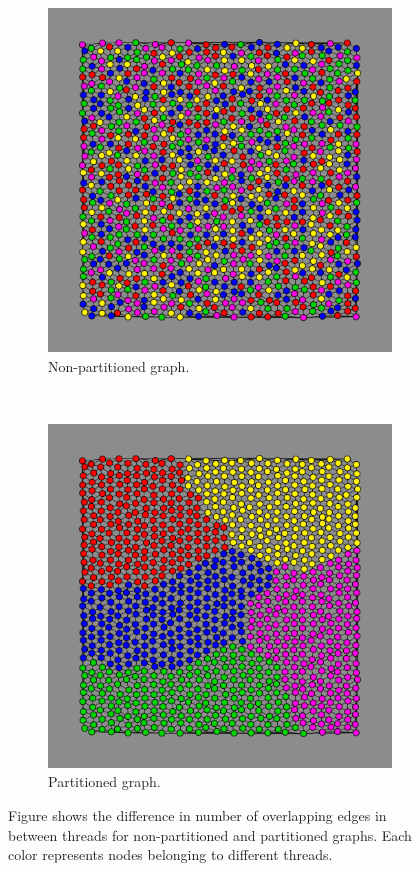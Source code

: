 \begin{figure}[H]
\centering
\begin{subfigure}[b]{0.48\textwidth}
\includegraphics[width=\textwidth]{img/partitioning_false.png}
\caption{Non-partitioned graph.}
\end{subfigure}
~
\begin{subfigure}[b]{0.48\textwidth}
\includegraphics[width=\textwidth]{img/partitioning_true.png}
\caption{Partitioned graph.}
\end{subfigure}
\caption{Figure shows the difference in number of overlapping edges in between threads for non-partitioned and partitioned graphs. Each color represents nodes belonging to different threads.}
\label{fig:partitioning}
\end{figure}

